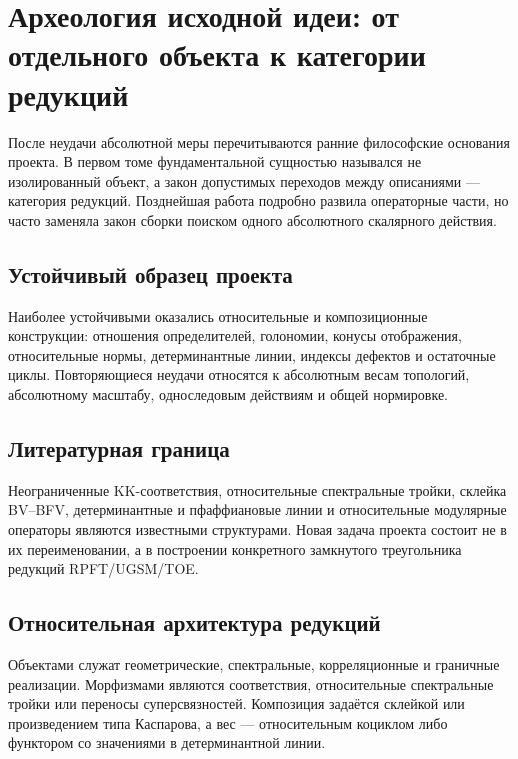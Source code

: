 \chapter{Археология исходной идеи: от отдельного объекта к категории редукций}

После неудачи абсолютной меры перечитываются ранние философские основания
проекта. В первом томе фундаментальной сущностью назывался не изолированный
объект, а закон допустимых переходов между описаниями --- категория
редукций. Позднейшая работа подробно развила операторные части, но часто
заменяла закон сборки поиском одного абсолютного скалярного действия.

\section{Устойчивый образец проекта}

Наиболее устойчивыми оказались относительные и композиционные конструкции:
отношения определителей, голономии, конусы отображения, относительные нормы,
детерминантные линии, индексы дефектов и остаточные циклы. Повторяющиеся
неудачи относятся к абсолютным весам топологий, абсолютному масштабу,
односледовым действиям и общей нормировке.

\section{Литературная граница}

Неограниченные KK-соответствия, относительные спектральные тройки, склейка
BV--BFV, детерминантные и пфаффиановые линии и относительные модулярные
операторы являются известными структурами. Новая задача проекта состоит не
в их переименовании, а в построении конкретного замкнутого треугольника
редукций RPFT/UGSM/TOE.

\section{Относительная архитектура редукций}

\begin{definition}
Объектами служат геометрические, спектральные, корреляционные и граничные
реализации. Морфизмами являются соответствия, относительные спектральные
тройки или переносы суперсвязностей. Композиция задаётся склейкой или
произведением типа Каспарова, а вес --- относительным коциклом либо
функтором со значениями в детерминантной линии.
\end{definition}

